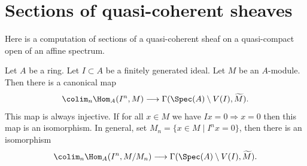 \section{Sections of quasi-coherent sheaves}
\label{section-sections-quasi-coherent}

\noindent
Here is a computation of sections of a quasi-coherent sheaf on a quasi-compact
open of an affine spectrum.

\begin{lemma}
\label{lemma-sections-over-quasi-compact-open-in-affine}
Let $A$ be a ring.
Let $I \subset A$ be a finitely generated ideal.
Let $M$ be an $A$-module.
Then there is a canonical map
$$
\colim_n \Hom_A(I^n, M)
\longrightarrow
\Gamma(\Spec(A) \setminus V(I), \widetilde{M}).
$$
This map is always injective.
If for all $x \in M$ we have $Ix = 0 \Rightarrow x = 0$
then this map is an isomorphism. In general, set
$M_n = \{x \in M \mid I^nx = 0\}$, then there is an
isomorphism
$$
\colim_n \Hom_A(I^n, M/M_n)
\longrightarrow
\Gamma(\Spec(A) \setminus V(I), \widetilde{M}).
$$
\end{lemma}

